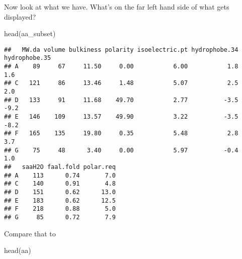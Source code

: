 \documentclass[
]{book}
\newenvironment{Shaded}{\begin{snugshade}}{\end{snugshade}}
\newcommand{\FunctionTok}[1]{\textcolor[rgb]{0.00,0.00,0.00}{#1}}
\newcommand{\NormalTok}[1]{#1}
\newcommand{\OtherTok}[1]{\textcolor[rgb]{0.56,0.35,0.01}{#1}}
\newcommand{\SpecialCharTok}[1]{\textcolor[rgb]{0.00,0.00,0.00}{#1}}
\begin{document}
\begin{Shaded}
\end{Shaded}

Now look at what we have. What's on the far left hand side of what gets displayed?

\begin{Shaded}
\begin{Highlighting}[]
\FunctionTok{head}\NormalTok{(aa\_subset)}
\end{Highlighting}
\end{Shaded}

\begin{verbatim}
##   MW.da volume bulkiness polarity isoelectric.pt hydrophobe.34 hydrophobe.35
## A    89     67     11.50     0.00           6.00           1.8           1.6
## C   121     86     13.46     1.48           5.07           2.5           2.0
## D   133     91     11.68    49.70           2.77          -3.5          -9.2
## E   146    109     13.57    49.90           3.22          -3.5          -8.2
## F   165    135     19.80     0.35           5.48           2.8           3.7
## G    75     48      3.40     0.00           5.97          -0.4           1.0
##   saaH2O faal.fold polar.req
## A    113      0.74       7.0
## C    140      0.91       4.8
## D    151      0.62      13.0
## E    183      0.62      12.5
## F    218      0.88       5.0
## G     85      0.72       7.9
\end{verbatim}

Compare that to

\begin{Shaded}
\begin{Highlighting}[]
\FunctionTok{head}\NormalTok{(aa)}
\end{Highlighting}
\end{Shaded}
\end{document}
